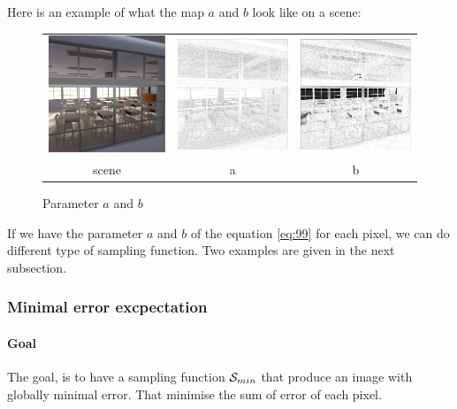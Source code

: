 \documentclass{classeENS}
\begin{document}
Here is an example of what the map $a$ and $b$ look like on a scene:
\begin{figure}[H]
    \centering
    \caption{Parameter $a$ and $b$}
    \label{fig:a}
    \begin{tabular}{ccc}
    \includegraphics[width=45mm]{image/without/gt.png}
    & \includegraphics[width=45mm]{image/without/a.png}
    & \includegraphics[width=45mm]{image/without/b.png} \\
    scene & a & b
    \end{tabular}
\end{figure}

If we have the parameter $a$ and $b$ of the equation \ref{eq:99} for each pixel, 
we can do different type of sampling function. Two examples are given in 
the next subsection.


\subsubsection{Minimal error excpectation}
\paragraph*{Goal} The goal, is to have a sampling function $\mathcal S_{min}$ that produce
 an image with globally minimal error. That minimise the sum of error of each pixel.
\end{document}
